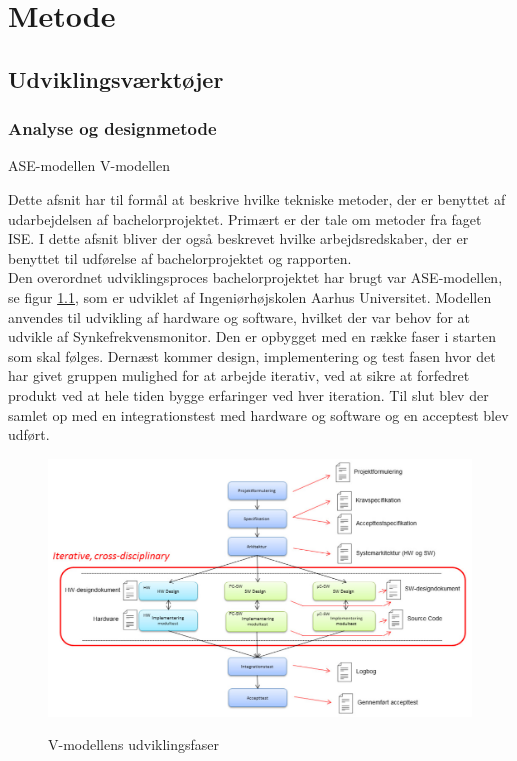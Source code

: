 \chapter{Metode}

\section{Udviklingsværktøjer}

\subsection{Analyse og designmetode}
ASE-modellen
V-modellen

Dette afsnit har til formål at beskrive hvilke tekniske metoder, der er benyttet af udarbejdelsen af bachelorprojektet. Primært er der tale om metoder fra faget ISE. I dette afsnit bliver der også beskrevet hvilke arbejdsredskaber, der er benyttet til udførelse af bachelorprojektet og rapporten.\\

Den overordnet udviklingsproces bachelorprojektet har brugt var ASE-modellen, se figur \ref{asemodel}, som er udviklet af Ingeniørhøjskolen Aarhus Universitet.  Modellen anvendes til udvikling af hardware og software, hvilket der var behov for at udvikle af Synkefrekvensmonitor. Den er opbygget med en række faser i starten som skal følges. Dernæst kommer design, implementering og test fasen hvor det har givet gruppen mulighed for at arbejde iterativ, ved at sikre at forfedret produkt ved at hele tiden bygge erfaringer ved hver iteration. Til slut blev der samlet op med en integrationstest med hardware og software og en acceptest blev udført.

\begin{figure}[H]
\centering
{\includegraphics[width=\textwidth]
{Figure/asemodel}}
\caption{V-modellens udviklingsfaser\cite{IngenirhjskolenAarhusUniversitetDevelopmentASE}}
\label{asemodel}
\end{figure}

